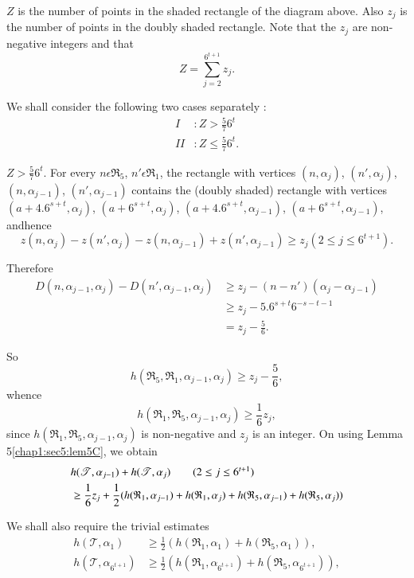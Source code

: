 $Z$ is the number of points in the shaded rectangle of the diagram above. Also $z_{j}$ is the number of points in the doubly shaded rectangle. Note that the $z_{j}$ are non-negative integers and that
$$
Z = \sum_{j = 2}^{6^{t+1}} z_{j}.
$$

We shall consider the following two cases separately :
\begin{align*}
 I & : Z > \frac{5}{7} 6^{t}\\
 II & : Z \leq \frac{5}{7} 6^{t}.
\end{align*}

\medskip
{} $Z > \frac{5}{7} 6^{t}$. For every $n \epsilon \mathfrak{R}_{5}$, $n' \epsilon \mathfrak{R}_{1}$, the rectangle with vertices $(n, \alpha_{j})$, $(n', \alpha_{j})$, $(n, \alpha_{j-1})$, $(n', \alpha_{j-1})$ contains the (doubly shaded) rectangle with vertices $(a + 4.6^{s+t}, \alpha_{j})$, $(a + 6^{s+t}, \alpha_{j})$, $(a + 4.6^{s+t}, \alpha_{j-1})$, $(a + 6^{s+t}, \alpha_{j-1})$, 
and\pageoriginale hence
$$
z(n, \alpha_{j}) - z(n', \alpha_{j}) - z(n, \alpha_{j-1}) + z(n', \alpha_{j-1}) \geq z_{j} (2 \leq j \leq 6^{t+1}).
$$

Therefore
\begin{align*}
D(n, \alpha_{j-1}, \alpha_{j}) - D(n', \alpha_{j-1}, \alpha_{j}) & \geq z_{j} - (n - n')(\alpha_{j} - \alpha_{j-1})\\
 & \geq z_{j} - 5.6^{s+t} 6^{-s-t-1}\\
 & = z_{j} - \frac{5}{6}.
\end{align*}

So
$$
h(\mathfrak{R}_{5}, \mathfrak{R}_{1}, \alpha_{j-1}, \alpha_{j}) \geq z_{j} - \frac{5}{6},
$$
whence
$$
h(\mathfrak{R}_{1}, \mathfrak{R}_{5}, \alpha_{j-1}, \alpha_{j}) \geq \frac{1}{6} z_{j},
$$
since $h(\mathfrak{R}_{1}, \mathfrak{R}_{5}, \alpha_{j-1}, \alpha_{j})$ is non-negative and $z_{j}$ is an integer. On using Lemma 5\ref{chap1:sec5:lem5C}, we obtain
\begin{align*}
& h(\mathscr{T}, \alpha_{j-1}) + h(\mathscr{T}, \alpha_{j})\tag*{$(2 \leq j \leq 6^{t+1})$}\\ 
& \geq \frac{1}{6} z_{j} + \frac{1}{2}(h(\mathfrak{R}_{1}, \alpha_{j-1}) + h(\mathfrak{R}_{1}, \alpha_{j}) + h(\mathfrak{R}_{5}, \alpha_{j-1}) + h(\mathfrak{R}_{5}, \alpha_{j}))
\end{align*}

We shall also require the trivial estimates
\begin{align*}
h(\mathscr{T}, \alpha_{1}) & \geq \frac{1}{2} (h(\mathfrak{R}_{1}, \alpha_{1}) + h(\mathfrak{R}_{5}, \alpha_{1})),\\
h(\mathscr{T}, \alpha_{6^{t+1}}) & \geq \frac{1}{2} (h(\mathfrak{R}_{1}, \alpha_{6^{t+1}}) + h(\mathfrak{R}_{5}, \alpha_{6^{t+1}})),\\
\end{align*}

